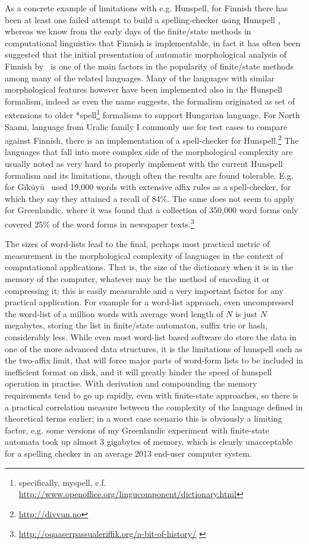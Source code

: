 \documentclass[officiallayout,final]{unihelcompling}
\begin{document}
As a concrete example of limitations with e.g. Hunspell, for Finnish there has
been at least one failed attempt to build a spelling-checker using Hunspell
\citep{pitkanen2006hunspell}, whereas we know from the early days of the
finite\-/state methods in computational linguistics that Finnish is
implementable, in fact it has often been suggested that the initial
presentation of automatic morphological analysis of Finnish
by~\citet{koskenniemi1983twolevel} is one of the main factors in the popularity
of finite\-/state methods among many of the related languages. Many of the
languages with similar morphological features however have been implemented
also in the Hunspell formalism, indeed as even the name suggests, the formalism
originated as set of extensions to older *spell\footnote{specifically, myspell,
c.f.  \url{http://www.openoffice.org/lingucomponent/dictionary.html}}
formalisms to support Hungarian language.  For North Saami,  language from
Uralic family I commonly use for test cases to compare against Finnish, there
is an implementation of a spell-checker for
Hunspell.\footnote{\url{http://divvun.no}} The languages that fall into
more complex side of the morphological complexity are usually noted as very
hard to properly implement with the current Hunspell formalism and its
limitations, though often the results are found tolerable. E.g. for
Gīkūyū~\citet{chege2010developing} used 19,000 words with extensive affix rules
as a spell-checker, for which they say they attained a recall of 84\%. The same
does not seem to apply for Greenlandic, where it was found that a collection of
350,000 word forms only covered 25\% of the word forms in newspaper
texts.\footnote{\url{http://oqaaserpassualeriffik.org/a-bit-of-history/}
\label{footnote:greenlandic}}

The sizes of word-lists lead to the final, perhaps most practical metric of
measurement in the morphological complexity of languages in the context of
computational applications. That is, the size of the dictionary when it is in
the memory of the computer, whatever may be the method of encoding it or
compressing it; this is easily measurable and a very important factor for any
practical application.  For example for a word-list approach, even uncompressed
the word-list of a million words with average word length of $N$ is just $N$
megabytes, storing the list in finite\-/state automaton, suffix trie or hash,
considerably less. While even most word-list based software do store the data
in one of the more advanced data structures, it is the limitations of hunspell
such as the two-affix limit, that will force major parts of word-form lists to
be included in inefficient format on disk, and it will greatly hinder the speed
of hunspell operation in practise. With derivation and compounding the memory
requirements tend to go up rapidly, even with finite-state approaches, so there
is a practical correlation measure between the complexity of the language
defined in theoretical terms earlier; in a worst case scenario this is
obviously a limiting factor, e.g. some versions of my Greenlandic experiment
with finite-state automata took up almost 3 gigabytes of memory, which is
clearly unacceptable for a spelling checker in an average 2013 end-user
computer system.
\end{document}
